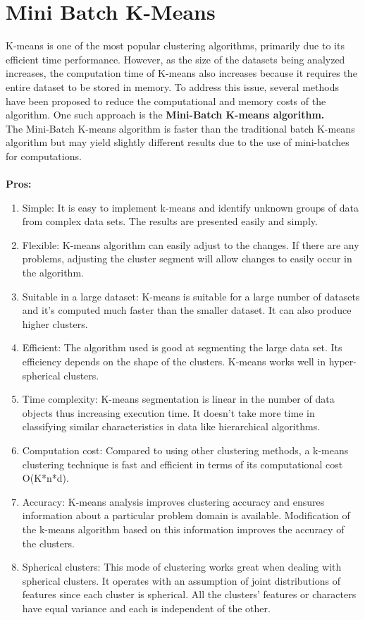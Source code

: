 \documentclass{template}
\begin{document}
\section{Mini Batch K-Means}
K-means is one of the most popular clustering algorithms, primarily due to its efficient time performance. However, as the size of the datasets being analyzed increases, the computation time of K-means also increases because it requires the entire dataset to be stored in memory. To address this issue, several methods have been proposed to reduce the computational and memory costs of the algorithm. One such approach is the \textbf{Mini-Batch K-means algorithm.}\\
The Mini-Batch K-means algorithm is faster than the traditional batch K-means algorithm but may yield slightly different results due to the use of mini-batches for computations.\cite{CL1}\\\\
\textbf{Pros:}
\begin{enumerate}
  \item Simple: It is easy to implement k-means and identify unknown groups of data from complex data sets. The results are presented easily and simply.
  \item Flexible: K-means algorithm can easily adjust to the changes. If there are any problems, adjusting the cluster segment will allow changes to easily occur in the algorithm.
  \item Suitable in a large dataset: K-means is suitable for a large number of datasets and it’s computed much faster than the smaller dataset. It can also produce higher clusters.
  \item Efficient: The algorithm used is good at segmenting the large data set. Its efficiency depends on the shape of the clusters. K-means works well in hyper-spherical clusters.
  \item Time complexity: K-means segmentation is linear in the number of data objects thus increasing execution time. It doesn’t take more time in classifying similar characteristics in data like hierarchical algorithms.
  \item Computation cost: Compared to using other clustering methods, a k-means clustering technique is fast and efficient in terms of its computational cost O(K*n*d).
  \item Accuracy: K-means analysis improves clustering accuracy and ensures information about a particular problem domain is available. Modification of the k-means algorithm based on this information improves the accuracy of the clusters.
  \item Spherical clusters: This mode of clustering works great when dealing with spherical clusters. It operates with an assumption of joint distributions of features since each cluster is spherical. All the clusters' features or characters have equal variance and each is independent of the other.
\end{enumerate}
\end{document}
